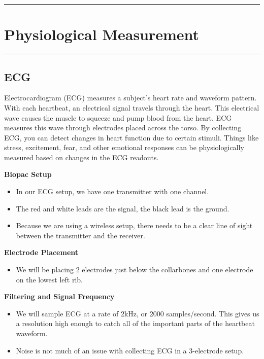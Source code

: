 \documentclass[]{book}
\providecommand{\tightlist}{%
  \setlength{\itemsep}{0pt}\setlength{\parskip}{0pt}}
\begin{document}
\begin{center}\rule{0.5\linewidth}{0.5pt}\end{center}

\hypertarget{physiological-measurement}{%
\section{Physiological Measurement}\label{physiological-measurement}}

\begin{center}\rule{0.5\linewidth}{0.5pt}\end{center}

\hypertarget{ecg}{%
\subsection{ECG}\label{ecg}}

Electrocardiogram (ECG) measures a subject's heart rate and waveform pattern. With each heartbeat, an electrical signal travels through the heart. This electrical wave causes the muscle to squeeze and pump blood from the heart. ECG measures this wave through electrodes placed across the torso. By collecting ECG, you can detect changes in heart function due to certain stimuli. Things like stress, excitement, fear, and other emotional responses can be physiologically measured based on changes in the ECG readouts.

\textbf{Biopac Setup}

\begin{itemize}
\tightlist
\item
  In our ECG setup, we have one transmitter with one channel.
\item
  The red and white leads are the signal, the black lead is the ground.
\item
  Because we are using a wireless setup, there needs to be a clear line of sight between the transmitter and the receiver.
\end{itemize}

\textbf{Electrode Placement}

\begin{itemize}
\tightlist
\item
  We will be placing 2 electrodes just below the collarbones and one electrode on the lowest left rib.
\end{itemize}

\textbf{Filtering and Signal Frequency}

\begin{itemize}
\tightlist
\item
  We will sample ECG at a rate of 2kHz, or 2000 samples/second. This gives us a resolution high enough to catch all of the important parts of the heartbeat waveform.
\item
  Noise is not much of an issue with collecting ECG in a 3-electrode setup.
\end{itemize}
\end{document}
